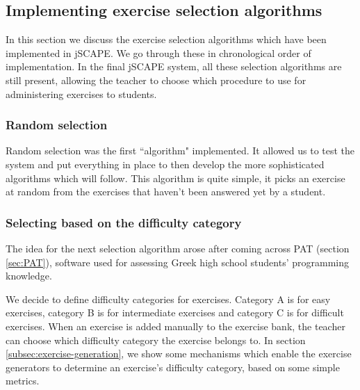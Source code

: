 \subsection{Implementing exercise selection algorithms}
\label{subsec:implementing-exercise-selection-algorithms}
In this section we discuss the exercise selection algorithms which have been implemented in jSCAPE. We go through these in chronological order of implementation. In the final jSCAPE system, all these selection algorithms are still present, allowing the teacher to choose which procedure to use for administering exercises to students.

\subsubsection{Random selection}
Random selection was the first ``algorithm" implemented. It allowed us to test the system and put everything in place to then develop the more sophisticated algorithms which will follow. This algorithm is quite simple, it picks an exercise at random from the exercises that haven't been answered yet by a student.

\subsubsection{Selecting based on the difficulty category}
The idea for the next selection algorithm arose after coming across PAT (section \ref{sec:PAT}), software used for assessing Greek high school students' programming knowledge.\newline

We decide to define difficulty categories for exercises. Category A is for easy exercises, category B is for intermediate exercises and category C is for difficult exercises. When an exercise is added manually to the exercise bank, the teacher can choose which difficulty category the exercise belongs to. In section \ref{subsec:exercise-generation}, we show some mechanisms which enable the exercise generators to determine an exercise's difficulty category, based on some simple metrics.

